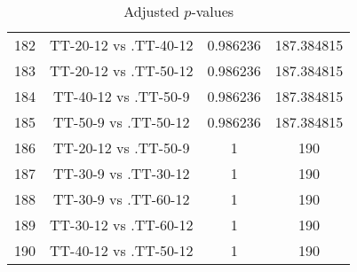 \documentclass[a4paper,10pt]{article}
\begin{document}
\begin{landscape}
\begin{table}[!htp]
\begin{tabular}{cccc}
182&TT-20-12 vs .TT-40-12&0.986236&187.384815\\
183&TT-20-12 vs .TT-50-12&0.986236&187.384815\\
184&TT-40-12 vs .TT-50-9&0.986236&187.384815\\
185&TT-50-9 vs .TT-50-12&0.986236&187.384815\\
186&TT-20-12 vs .TT-50-9&1&190\\
187&TT-30-9 vs .TT-30-12&1&190\\
188&TT-30-9 vs .TT-60-12&1&190\\
189&TT-30-12 vs .TT-60-12&1&190\\
190&TT-40-12 vs .TT-50-12&1&190\\
\hline
\end{tabular}
\caption{Adjusted $p$-values}
\end{table}

\end{landscape}
\end{document}
